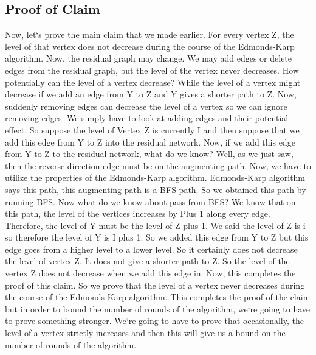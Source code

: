 \subsection{Proof of Claim}
Now, let`s prove the main claim that we made earlier.
For every vertex Z, the level of that vertex does not decrease during the course of the Edmonds-Karp algorithm.
Now, the residual graph may change.
We may add edges or delete edges from the residual graph, but the level of the vertex never decreases.
How potentially can the level of a vertex decrease? While the level of a vertex might decrease if we add an edge from Y to Z and Y gives a shorter path to Z\@.
Now, suddenly removing edges can decrease the level of a vertex so we can ignore removing edges.
We simply have to look at adding edges and their potential effect.
So suppose the level of Vertex Z is currently I and then suppose that we add this edge from Y to Z into the residual network.
Now, if we add this edge from Y to Z to the residual network, what do we know? Well, as we just saw, then the reverse direction edge must be on the augmenting path.
Now, we have to utilize the properties of the Edmonds-Karp algorithm.
Edmonds-Karp algorithm says this path, this augmenting path is a BFS path.
So we obtained this path by running BFS\@.
Now what do we know about pass from BFS? We know that on this path, the level of the vertices increases by Plus 1 along every edge.
Therefore, the level of Y must be the level of Z plus 1.
We said the level of Z is i so therefore the level of Y is I plus 1.
So we added this edge from Y to Z but this edge goes from a higher level to a lower level.
So it certainly does not decrease the level of vertex Z\@.
It does not give a shorter path to Z\@.
So the level of the vertex Z does not decrease when we add this edge in.
Now, this completes the proof of this claim.
So we prove that the level of a vertex never decreases during the course of the Edmonds-Karp algorithm.
This completes the proof of the claim but in order to bound the number of rounds of the algorithm, we`re going to have to prove something stronger.
We`re going to have to prove that occasionally, the level of a vertex strictly increases and then this will give us a bound on the number of rounds of the algorithm.

